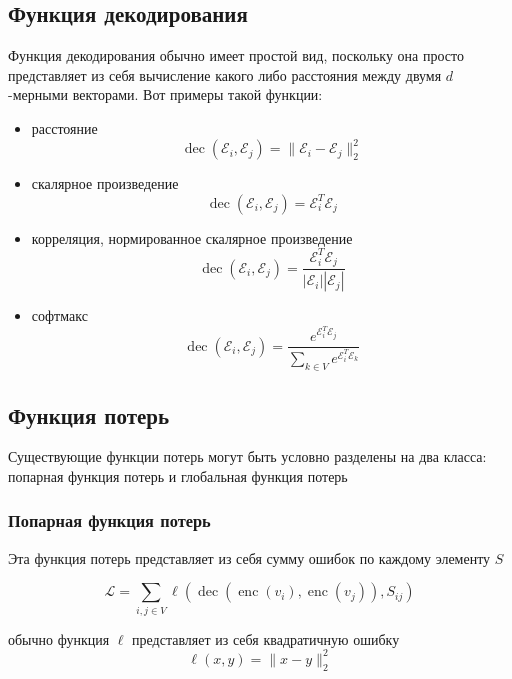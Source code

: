 \documentclass[12pt,a4paper]{extarticle}
\newcommand{\E}{\mathcal{E}}
\newcommand{\Loss}{\mathcal{L}}
\newcommand{\encoder}{\operatorname{enc}}
\newcommand{\decoder}{\operatorname{dec}}
\begin{document}
    \subsection{Функция декодирования}
    Функция декодирования обычно имеет простой вид, поскольку она просто представляет из себя вычисление какого либо расстояния между двумя $d$-мерными векторами. Вот примеры такой функции:
    \begin{itemize}
        \item расстояние
            \begin{equation} \label{dec_dist}
            \decoder(\E_i, \E_j) = \lVert \E_i - \E_j \rVert_2 ^ 2
            \end{equation}
        \item скалярное произведение
            \begin{equation} \label{dec_scal}
            \decoder(\E_i, \E_j) = \E_i^T\E_j
            \end{equation}
        \item корреляция, нормированное скалярное произведение
            \begin{equation} \label{corr}
            \decoder(\E_i, \E_j) =  \frac{\E_i^T\E_j}{|\E_i||\E_j|}
            \end{equation}
        \item софтмакс
            \[\decoder(\E_i, \E_j) = \frac{e^{\E_i^T\E_j}}{\sum_{k \in V} e^{\E_i^T\E_k}}\]
    \end{itemize}
    
    \subsection{Функция потерь}
    Существующие функции потерь могут быть условно разделены на два класса: попарная функция потерь и глобальная функция потерь
    
    \subsubsection{Попарная функция потерь}
    Эта функция потерь представляет из себя сумму ошибок по каждому элементу $S$
    
    \begin{equation} \label{pair_loss}
        \Loss = \sum_{i, j \in V} \ell (\decoder(\encoder(v_i), \encoder(v_j)), S_{ij})
    \end{equation}
    
    обычно функция $\ell$ представляет из себя квадратичную ошибку 
    \begin{equation} \label{pair_loss_dist}
    \ell(x, y) = \lVert x - y \rVert_2^2
    \end{equation}
    
\end{document}

